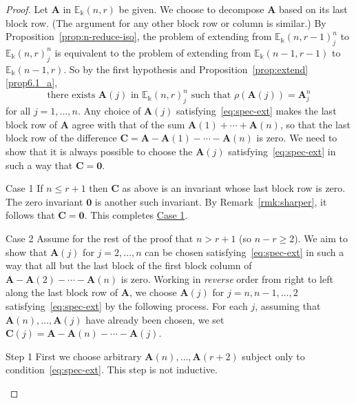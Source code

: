 \documentclass[ALCO,ThmDefs,Unicode,epreuves]{cedram}
\newcommand{\E}{\mathbb{E}}
\newcommand{\bA}{\mathbf{A}}
\newcommand{\bC}{\mathbf{C}}
\newcommand{\bzero}{\mathbf{0}}
\begin{document}
\begin{proof}
Let $\bA$ in $\E_\Bbbk(n,r)$ be given. We choose to decompose $\bA$
based on its last block row. (The argument for any other block row or
column is similar.) By Proposition~\ref{prop:n-reduce-iso}, the
problem of extending from $\E_\Bbbk(n,r-1)^n_j$ to $\E_\Bbbk(n,r)^n_j$
is equivalent to the problem of extending from $\E_\Bbbk(n-1,r-1)$ to
$\E_\Bbbk(n-1,r)$. So by the first hypothesis and Proposition~\ref{prop:extend}\ref{prop6.1_a},
\begin{equation}\label{eq:spec-ext}
\text{there exists $\bA(j)$ in $\E_\Bbbk(n,r)^n_j$ such that
 $\rho(\bA(j)) = \bA^n_j$}
\end{equation}
for all $j = 1, \dots, n$. Any choice of $\bA(j)$ satisfying~\eqref{eq:spec-ext} makes the last block row of $\bA$ agree with that of the sum $\bA(1)+\cdots +\bA(n)$, so that the last block row of the
difference $\bC=\bA-\bA(1)-\cdots -\bA(n)$ is zero. We need to show
that it is always possible to choose the $\bA(j)$ satisfying~\eqref{eq:spec-ext} in such a way that $\bC=\bzero$.

\begin{enonce*}{\hypertarget{Case 1}{Case 1}} If $n \le r+1$ then $\bC$ as
above is an invariant whose last block row is zero. The zero invariant
$\bzero$ is another such invariant. By Remark~\ref{rmk:sharper}, it
follows that $\bC= \bzero$. This completes \hyperlink{Case 1}{Case 1}.
\end{enonce*}

\begin{enonce*}{\hypertarget{Case 2}{Case 2}} Assume for the rest of the proof that $n > r+1$ (so
$n-r \ge 2$). We aim to show that $\bA(j)$ for $j=2, \dots, n$ can be
chosen satisfying~\eqref{eq:spec-ext} in such a way that all but the
last block of the first block column of $\bA - \bA(2) - \cdots -
\bA(n)$ is zero. Working in \emph{reverse} order from right to left
along the last block row of $\bA$, we choose $\bA(j)$ for $j = n, n-1,
\dots, 2$ satisfying~\eqref{eq:spec-ext} by the following process. For
each $j$, assuming that $\bA(n), \dots, \bA(j)$ have already been
chosen, we set $\bC(j)=\bA-\bA(n)-\cdots -\bA(j)$.

\begin{enonce*}[remark]{\hypertarget{Step 1}{Step 1}} First we choose arbitrary $\bA(n), \dots, \bA(r+2)$
subject only to condition~\eqref{eq:spec-ext}. This step is not
inductive.
\end{enonce*}


\end{enonce*}
\end{proof}
\end{document}
